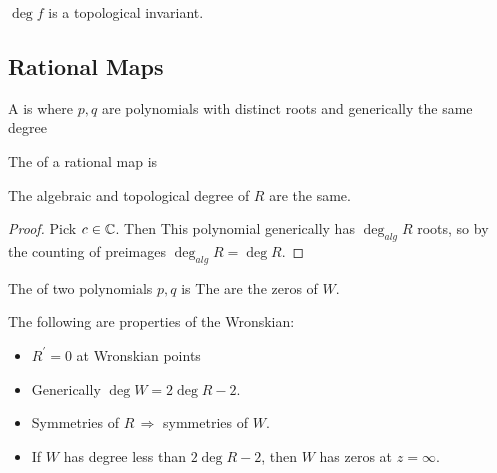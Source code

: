 \documentclass{article}
\begin{document}
\begin{prop}
$\deg f$ is a topological invariant. 
\end{prop}

\subsection{Rational Maps}

\begin{definition}
A  is 
where $p,q$ are polynomials with distinct roots and generically the same degree
\end{definition}

\begin{definition}
The  of a rational map is 
\end{definition}

\begin{prop}
The algebraic and topological degree of $R$ are the same. 
\end{prop}
\begin{proof}
Pick $c \in \mathbb{C}$. Then 
This polynomial generically has $\deg_{alg} R$ roots, so by the counting of preimages $\deg_{alg} R = \deg R$. 
\end{proof}

\begin{definition}[Wronskian]
The  of two polynomials $p,q$ is 
The  are the zeros of $W$. 
\end{definition}

\begin{prop}
The following are properties of the Wronskian:
\begin{itemize}
    \item $R^\prime = 0$ at Wronskian points 
    \item Generically $\deg W = 2\deg R - 2$. 
    \item Symmetries of $R \, \Rightarrow$ symmetries of $W$. 
    \item If $W$ has degree less than $2\deg R - 2$, then $W$ has zeros at $z = \infty$. 
\end{itemize}
\end{prop}

\end{document}
